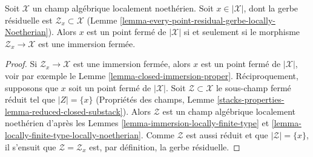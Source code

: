 \begin{lemma}
\label{lemma-residual-space-closed}
Soit $\mathcal{X}$ un champ alg\'ebrique localement noeth\'erien.
Soit $x \in |\mathcal{X}|$, dont la gerbe r\'esiduelle est
$\mathcal{Z}_x \subset \mathcal{X}$
(Lemme \ref{lemma-every-point-residual-gerbe-locally-Noetherian}).
Alors $x$ est un point ferm\'e de $|\mathcal{X}|$ si et seulement si
le morphisme $\mathcal{Z}_x \to \mathcal{X}$ est une immersion ferm\'ee.
\end{lemma}

\begin{proof}
Si $\mathcal{Z}_x \to \mathcal{X}$ est une immersion ferm\'ee, alors
$x$ est un point ferm\'e de $|\mathcal{X}|$, voir par exemple le
Lemme \ref{lemma-closed-immersion-proper}.
R\'eciproquement, supposons que $x$ soit un point ferm\'e de $|\mathcal{X}|$.
Soit $\mathcal{Z} \subset \mathcal{X}$
le sous-champ ferm\'e r\'eduit tel que $|Z| = \{x\}$
(Propri\'et\'es des champs,
Lemme \ref{stacks-properties-lemma-reduced-closed-substack}).
Alors $\mathcal{Z}$ est un champ alg\'ebrique localement noeth\'erien
d'apr\`es les Lemmes \ref{lemma-immersion-locally-finite-type} et
\ref{lemma-locally-finite-type-locally-noetherian}.
Comme $\mathcal{Z}$ est aussi r\'eduit et que $|\mathcal{Z}| = \{x\}$,
il s'ensuit que $\mathcal{Z} = \mathcal{Z}_x$ est, par d\'efinition, la
gerbe r\'esiduelle.
\end{proof}

















